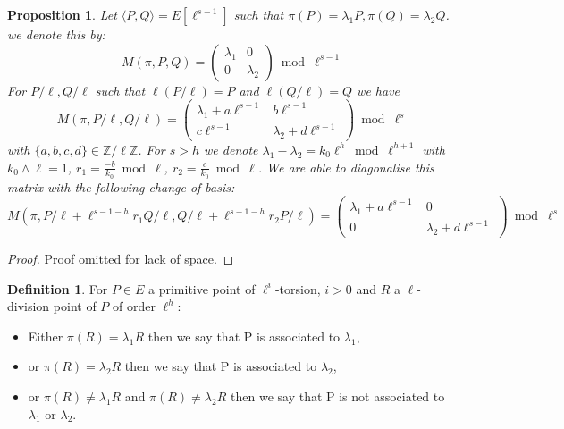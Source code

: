 \documentclass{article}
\theoremstyle{plain}
\newtheorem{prop}[thm]{Proposition}
\theoremstyle{definition}
\newtheorem{defi}[thm]{Definition}
\theoremstyle{remark}
\begin{document}
\begin{prop}\label{propdiago2}
Let $ \langle P,Q \rangle = E[\ell^{s-1}]$ such that $\pi(P)=\lambda_1 P, \pi(Q)=\lambda_2 Q $. we denote this by:
\[
M(\pi,P,Q)=\left( \begin{array}{cc}
\lambda_1 & 0\\
0 & \lambda_2 
\end{array} \right) \bmod \ell^{s-1}
\]
For $P/\ell,Q/\ell$ such that $\ell(P/\ell)=P$ and $\ell(Q/\ell)=Q$ we have \[M(\pi,P/\ell,Q/\ell)=\left( \begin{array}{cc}
\lambda_1 + a\ell^{s-1} & b\ell^{s-1}\\
c\ell^{s-1} & \lambda_2 + d\ell^{s-1}
\end{array} \right) \bmod \ell^{s} \] with $\{a,b,c,d\} \in \mathbb{Z}/ \ell \mathbb{Z}$. For $s>h$ we denote $\lambda_1-\lambda_2=k_0 \ell^h \bmod \ell^{h+1}$ with $k_0 \wedge \ell =1$, $r_1=\frac{-b}{k_0} \bmod \ell$, $r_2=\frac{c}{k_0} \bmod \ell$. We are able to diagonalise this matrix with the following change of basis:
 \[M(\pi,P/\ell+\ell^{s-1-h}r_1Q/\ell,Q/\ell+\ell^{s-1-h}r_2P/\ell)=\left( \begin{array}{cc}
\lambda_1 + a\ell^{s-1} & 0\\
0 & \lambda_2 + d\ell^{s-1}
\end{array} \right) \bmod \ell^{s} \]
\end{prop}

\begin{proof}
Proof omitted for lack of space.%
\end{proof}

\begin{defi}
For $P \in E$ a primitive point of $\ell^i$-torsion, $i>0$ and $R$ a $\ell$-division point of $P$ of order $\ell^h$:
\begin{itemize}
\item Either $\pi(R)=\lambda_1 R$ then we say that P is associated to $\lambda_1$, 
\item or $\pi(R)=\lambda_2 R$ then we say that P is associated to $\lambda_2$,
\item or $\pi(R)\neq \lambda_1 R$ and $\pi(R)\neq \lambda_2 R$ then we say that P is not associated to $\lambda_1$ or $\lambda_2$.
\end{itemize}  
\end{defi}
\end{document}
